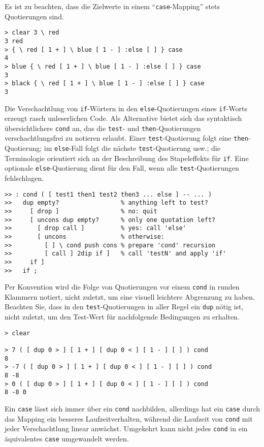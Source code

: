 Es ist zu beachten, dass die Zielwerte in einem "`\verb|case|-Mapping"' stets Quotierungen sind.

\begin{verbatim}
> clear 3 \ red
3 red
> { \ red [ 1 + ] \ blue [ 1 - ] :else [ ] } case
4
> blue { \ red [ 1 + ] \ blue [ 1 - ] :else [ ] } case
3
> black { \ red [ 1 + ] \ blue [ 1 - ] :else [ ] } case
3
\end{verbatim}

Die Verschachtlung von \verb|if|-Wörtern in den \verb|else|-Quotierungen eines \verb|if|-Worts erzeugt rasch unleserlichen Code. Als Alternative bietet sich das syntaktisch übersichtlichere \verb|cond| an, das die \verb|test|- und \verb|then|-Quo\-tie\-run\-gen verschachtlungsfrei zu notieren erlaubt. Einer \verb|test|-Quotierung folgt eine \verb|then|-Quotierung; im \verb|else|-Fall folgt die nächste \verb|test|-Quotierung usw.; die Terminologie orientiert sich an der Beschreibung des Stapeleffekts für \verb|if|. Eine optionale \verb|else|-Quotierung dient für den Fall, wenn alle \verb|test|-Quotierungen fehlschlagen.

\begin{verbatim}
>> : cond ( [ test1 then1 test2 then3 ... else ] -- ... )
>>   dup empty?                 % anything left to test?
>>     [ drop ]                 % no: quit
>>     [ uncons dup empty?      % only one quotation left?
>>       [ drop call ]          % yes: call 'else'
>>       [ uncons               % otherwise:
>>         [ ] \ cond push cons % prepare 'cond' recursion
>>         [ call ] 2dip if ]   % call 'testN' and apply 'if'
>>     if ]
>>   if ;
\end{verbatim}

Per Konvention wird die Folge von Quotierungen vor einem \verb|cond| in runden Klammern notiert, nicht zuletzt, um eine visuell leichtere Abgrenzung zu haben. Beachten Sie, dass in den \verb|test|-Quotierungen in aller Regel ein \verb|dup| nötig ist, nicht zuletzt, um den Test-Wert für nachfolgende Bedingungen zu erhalten.

\begin{verbatim}
> clear

> 7 ( [ dup 0 > ] [ 1 + ] [ dup 0 < ] [ 1 - ] [ ] ) cond
8
> -7 ( [ dup 0 > ] [ 1 + ] [ dup 0 < ] [ 1 - ] [ ] ) cond
8 -8
> 0 ( [ dup 0 > ] [ 1 + ] [ dup 0 < ] [ 1 - ] [ ] ) cond
8 -8 0
\end{verbatim}

Ein \verb|case| lässt sich immer über ein \verb|cond| nachbilden, allerdings hat ein \verb|case| durch das Mapping ein besseres Laufzeitverhalten, während die Laufzeit von \verb|cond| mit jeder Verschachtlung linear anwächst. Umgekehrt kann nicht jedes \verb|cond| in ein äquivalentes \verb|case| umgewandelt werden.

